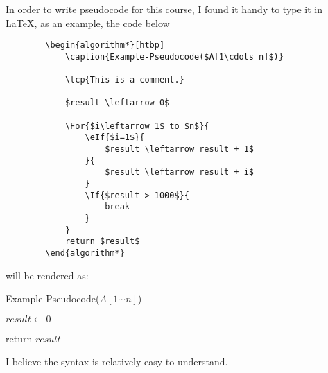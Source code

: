 \begin{spacing}{1.3}
    In order to write pseudocode for this course, I found it handy to type it in \LaTeX,
    as an example, the code below 

    \begin{verbatim}
        \begin{algorithm*}[htbp]
            \caption{Example-Pseudocode($A[1\cdots n]$)}

            \tcp{This is a comment.}

            $result \leftarrow 0$

            \For{$i\leftarrow 1$ to $n$}{
                \eIf{$i=1$}{
                    $result \leftarrow result + 1$
                }{
                    $result \leftarrow result + i$
                }
                \If{$result > 1000$}{
                    break
                }
            }
            return $result$
        \end{algorithm*}
    \end{verbatim}

    will be rendered as: 
    \begin{algorithm*}[htbp]
        \caption{Example-Pseudocode($A[1\cdots n]$)}


        $result \leftarrow 0$

        return $result$
    \end{algorithm*}
    
    I believe the syntax is relatively easy to understand.

\end{spacing}